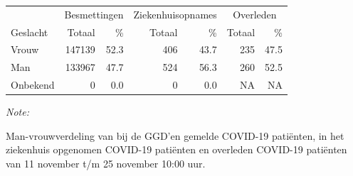 \documentclass[
  english,
  man,floatsintext]{apa6}
\begin{document}
\begin{table}
\centering\begingroup\fontsize{11}{13}\selectfont

\begin{threeparttable}
\begin{tabular}{lrrrrrr}
\toprule
\multicolumn{1}{c}{ } & \multicolumn{2}{c}{Besmettingen} & \multicolumn{2}{c}{Ziekenhuisopnames} & \multicolumn{2}{c}{Overleden} \\
\cmidrule(l{3pt}r{3pt}){2-3} \cmidrule(l{3pt}r{3pt}){4-5} \cmidrule(l{3pt}r{3pt}){6-7}
Geslacht & Totaal & \% & Totaal & \% & Totaal & \%\\
\midrule
Vrouw & 147139 & 52.3 & 406 & 43.7 & 235 & 47.5\\
Man & 133967 & 47.7 & 524 & 56.3 & 260 & 52.5\\
Onbekend & 0 & 0.0 & 0 & 0.0 & NA & NA\\
\bottomrule
\end{tabular}
\begin{tablenotes}
\item \textit{Note: } 
\item Man-vrouwverdeling van bij de GGD’en gemelde COVID-19 patiënten, in het ziekenhuis opgenomen COVID-19 patiënten en overleden COVID-19 patiënten van 11 november t/m 25 november 10:00 uur.
\end{tablenotes}
\end{threeparttable}
\endgroup{}
\end{table}
\newpage
\end{document}
